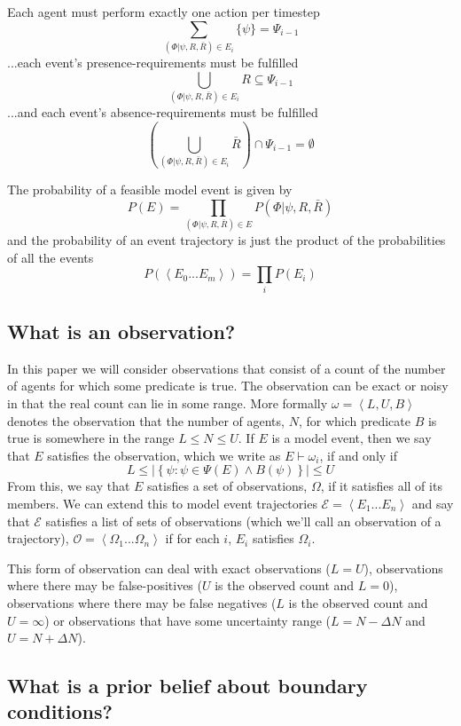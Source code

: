 \documentclass[sigconf]{aamas}
\begin{document}
Each agent must perform exactly one action per timestep
\begin{equation}
\sum_{(\Phi|\psi,R,\bar{R})\in E_i}\{\psi\} = \Psi_{i-1}
\label{agency}
\end{equation}
...each event's presence-requirements must be fulfilled
\[
\bigcup_{(\Phi|\psi,R,\bar{R})\in E_i} R \subseteq \Psi_{i-1}
\]
...and each event's absence-requirements must be fulfilled
\[
\left(\bigcup_{(\Phi|\psi,R,\bar{R})\in E_i} \bar{R}\right) \cap \Psi_{i-1} = \emptyset
\]

The probability of a feasible model event is given by
\[
P(E) = \prod_{(\Phi|\psi,R,\bar{R}) \in E} P(\Phi|\psi,R,\bar{R})
\]
and the probability of an event trajectory is just the product of the probabilities of all the events
\[
P(\left<E_0...E_m\right>) = \prod_{i}P(E_i)
\]


\subsection{What is an observation?}

In this paper we will consider observations that consist of a count of the number of agents for which some predicate is true. The observation can be exact or noisy in that the real count can lie in some range. More formally $\omega = \left<L,U,B\right>$ denotes the observation that the number of agents, $N$, for which predicate $B$ is true is somewhere in the range  $L \le N \le U$. If $E$ is a model event,  then we say that $E$ satisfies the observation, which we write as $E \vdash \omega_i$, if and only if
\[
L \le \left|\left\{\psi:\psi \in \Psi(E) \wedge B(\psi)\right\}\right| \le U
\]
From this, we say that $E$ satisfies a set of observations, $\Omega$, if it satisfies all of its members. We can extend this to model event trajectories $\mathcal{E} = \left<E_1...E_n\right>$ and say that $\mathcal{E}$ satisfies a list of sets of observations (which we'll call an observation of a trajectory), $\mathcal{O} = \left<\Omega_1...\Omega_n\right>$ if for each $i$, $E_i$ satisfies $\Omega_i$.

This form of observation can deal with exact observations ($L=U$), observations where there may be false-positives ($U$ is the observed count and $L=0$), observations where there may be false negatives ($L$ is the observed count and $U=\infty$) or observations that have some uncertainty range ($L = N - \Delta N$ and $U = N + \Delta N$).
 
\subsection{What is a prior belief about boundary conditions?}
\end{document}
